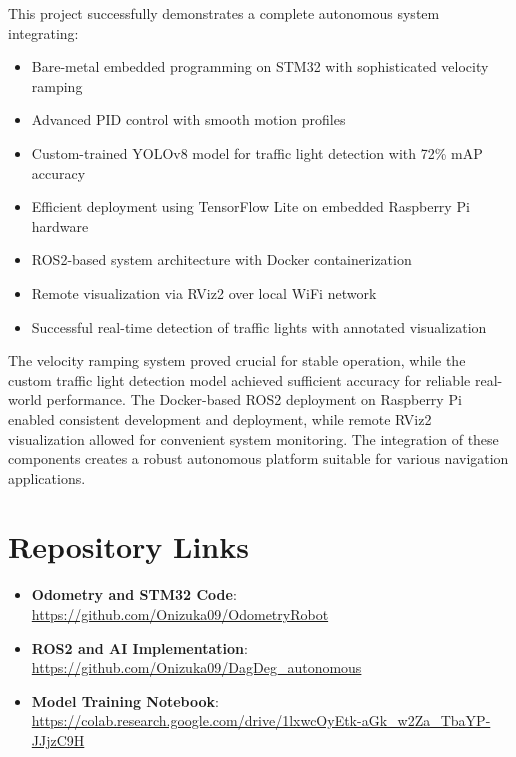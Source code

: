 \documentclass[12pt,a4paper]{article}
\begin{document}
	This project successfully demonstrates a complete autonomous system integrating:
	\begin{itemize}
		\item Bare-metal embedded programming on STM32 with sophisticated velocity ramping
		\item Advanced PID control with smooth motion profiles
		\item Custom-trained YOLOv8 model for traffic light detection with 72\% mAP accuracy
		\item Efficient deployment using TensorFlow Lite on embedded Raspberry Pi hardware
		\item ROS2-based system architecture with Docker containerization
		\item Remote visualization via RViz2 over local WiFi network
		\item Successful real-time detection of traffic lights with annotated visualization
	\end{itemize}
	
	The velocity ramping system proved crucial for stable operation, while the custom traffic light detection model achieved sufficient accuracy for reliable real-world performance. The Docker-based ROS2 deployment on Raspberry Pi enabled consistent development and deployment, while remote RViz2 visualization allowed for convenient system monitoring. The integration of these components creates a robust autonomous platform suitable for various navigation applications.
	
	\section{Repository Links}
	\begin{itemize}
		\item \textbf{Odometry and STM32 Code}: \url{https://github.com/Onizuka09/OdometryRobot}
		\item \textbf{ROS2 and AI Implementation}: \url{https://github.com/Onizuka09/DagDeg_autonomous}
		\item \textbf{Model Training Notebook}: \url{https://colab.research.google.com/drive/1lxwcOyEtk-aGk_w2Za_TbaYP-JJjzC9H}
	\end{itemize}
\end{document}
